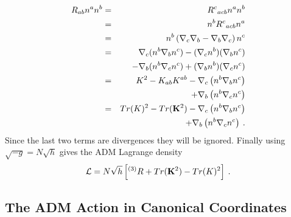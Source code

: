 \begin{eqnarray*}
   R_{ab} n^a n^b & = & {R^c}_{acb} n^a n^b \\
                  & = & n^b {R^c}_{acb}n^a \\
                  & = & n^b \left( \nabla_c \nabla_b - \nabla_b \nabla_c \right) n^c \\
                  & = & \nabla_c(n^b \nabla_b n^c)-(\nabla_c n^b)(\nabla_b n^c) \\
                  &   & - \nabla_b(n^b \nabla_c n^c)+(\nabla_b n^b)(\nabla_c n^c) \\
                  & = & K^2 - K_{ab} K^{ab} -
                          \nabla_c \left( n^b \nabla_b n^c \right) \\
                  &   & + \nabla_b \left( n^b \nabla_c n^c \right)  \\
                  & = & Tr(K)^2 - Tr({\mathbf K}^2) -
                          \nabla_c \left( n^b \nabla_b n^c \right) \\
                  &   & + \nabla_b \left( n^b \nabla_c n^c \right)  \: .
\end{eqnarray*}
Since the last two terms are divergences they will be ignored.  Finally using
$\sqrt{-g} = N \sqrt{h}$ gives the ADM Lagrange density
\begin{equation}\label{eq:Hilbert_L}
   {\mathcal L} = N \sqrt{h} \left[ {}^{(3)}R + Tr({\mathbf K^2}) - Tr(K)^2 \right] \: .
\end{equation}


\subsection{The ADM Action in Canonical Coordinates}\label{SS:Can_ADM}

